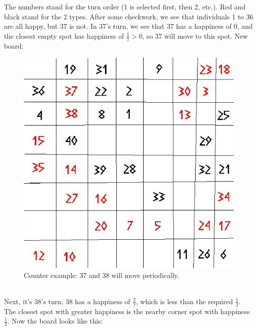 The numbers stand for the turn order (1 is selected first, then 2, etc.). Red and black stand for the 2 types. After some checkwork, we see that individuals 1 to 36 are all happy, but 37 is not. In 37's turn, we see that 37 has a happiness of $0$, and the closest empty spot has happiness of $\frac{1}{7} > 0$, so 37 will move to this spot. New board:
\begin{figure}[h!]
\begin{center}
\includegraphics[scale=0.25]{Tegenvoorbeeld/segregation_tegenvb_1.jpg}
\end{center}
\caption{Counter example: 37 and 38 will move periodically.}\label{counterexample1}
\end{figure}
\\Next, it's 38's turn. 38 has a happiness of $\frac{2}{7}$, which is less than the required $\frac{1}{3}$. The closest spot with greater happiness is the nearby corner spot with happiness $\frac{1}{3}$. Now the board looks like this:
